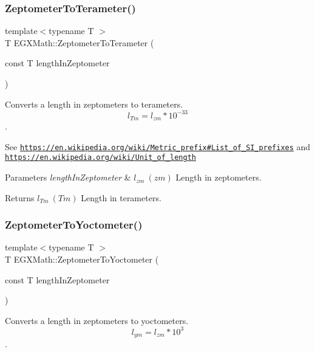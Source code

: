 \subsubsection{\texorpdfstring{Zeptometer\+To\+Terameter()}{ZeptometerToTerameter()}}
{\footnotesize\ttfamily template$<$typename T $>$ \\
T E\+G\+X\+Math\+::\+Zeptometer\+To\+Terameter (\begin{DoxyParamCaption}\item[{const T}]{length\+In\+Zeptometer }\end{DoxyParamCaption})}



Converts a length in zeptometers to terameters. \[ l_{Tm}=l_{zm} * 10^{-33} \]. 

See \href{https://en.wikipedia.org/wiki/Metric_prefix#List_of_SI_prefixes}{\tt https\+://en.\+wikipedia.\+org/wiki/\+Metric\+\_\+prefix\#\+List\+\_\+of\+\_\+\+S\+I\+\_\+prefixes} and \href{https://en.wikipedia.org/wiki/Unit_of_length}{\tt https\+://en.\+wikipedia.\+org/wiki/\+Unit\+\_\+of\+\_\+length} 
\begin{DoxyParams}{Parameters}
{\em length\+In\+Zeptometer} & $ l_{zm}\ (zm)$ Length in zeptometers. \\
\hline
\end{DoxyParams}
\begin{DoxyReturn}{Returns}
$ l_{Tm}\ (Tm)$ Length in terameters. 
\end{DoxyReturn}
\mbox{\label{group___e_g_x_math-_conversions-_length_conversions-_s_i-_zeptometer-_s_i_ga0477d1a8cb246721ce00cfd7b73d5c9e}} 
\subsubsection{\texorpdfstring{Zeptometer\+To\+Yoctometer()}{ZeptometerToYoctometer()}}
{\footnotesize\ttfamily template$<$typename T $>$ \\
T E\+G\+X\+Math\+::\+Zeptometer\+To\+Yoctometer (\begin{DoxyParamCaption}\item[{const T}]{length\+In\+Zeptometer }\end{DoxyParamCaption})}



Converts a length in zeptometers to yoctometers. \[ l_{ym}=l_{zm} * 10^{3} \]. 

